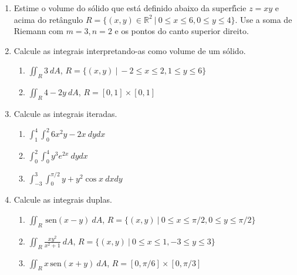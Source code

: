 \documentclass[a4paper,5pt]{amsbook}
\newcommand{\sen}{\,\mbox{sen}}
\newcommand{\ds}{\displaystyle}
\begin{document}
\vspace{1cm}
\begin{enumerate}
    \setlength\itemsep{0.5cm}
    \item Estime o volume do s\'olido que est\'a definido abaixo da superf\'{\i}cie
    $z=xy$ e acima do ret\^angulo $R=\{(x,y)\in\mathbb{R}^2\ |\ 0 \le x \le 6, 0
    \le y \le 4\}$.  Use a soma de Riemann com $m=3, n=2$ e os pontos do canto
    superior direito.

    \item Calcule as integrais interpretando-as como volume de um s\'olido.
        \begin{enumerate}
            \setlength\itemsep{0.2cm}
            \item $\ds\iint_R 3\ dA$, $R=\{(x,y)\ |\ -2 \le x \le 2, 1 \le y \le
            6\}$
            \item $\ds\iint_R 4-2y\ dA$, $R=[0,1]\times[0,1]$
        \end{enumerate}

    \item Calcule as integrais iteradas.
        \begin{enumerate}
            \setlength\itemsep{0.2cm}
            \item $\ds\int_1^4\int_0^2 6x^2y-2x\ dydx$
            \item $\ds\int_0^2\int_0^4 y^3e^{2x}\ dydx$
            \item $\ds\int_{-3}^3\int_0^{\pi/2} y+y^2\cos{x}\ dxdy$
        \end{enumerate}

    \item Calcule as integrais duplas.
        \begin{enumerate}
            \setlength\itemsep{0.2cm}
            \item $\ds\iint_R \sen(x-y)\ dA$, $R=\{(x,y)\ |\ 0 \le x \le \pi/2,
            0 \le y \le \pi/2\}$
            \item $\ds\iint_R \frac{xy^2}{x^2+1}\ dA$, $R=\{(x,y)\ |\ 0 \le x
            \le 1, -3 \le y \le 3\}$
            \item $\ds\iint_R x\sen(x+y)\ dA$, $R=[0,\pi/6]\times[0,\pi/3]$
        \end{enumerate}
\end{enumerate}
\end{document}
